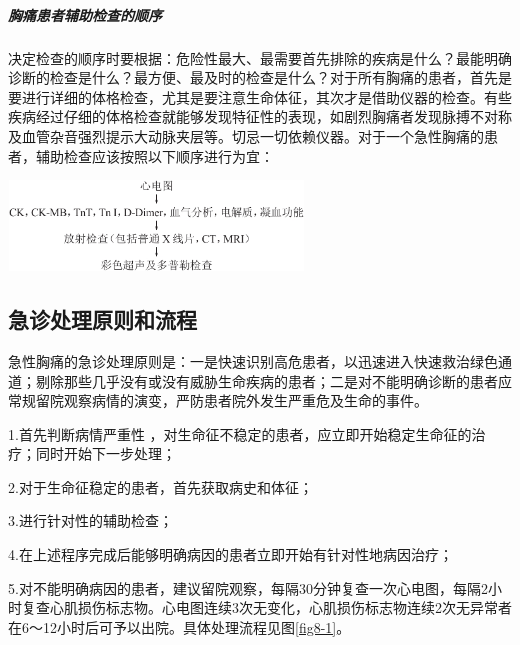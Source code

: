 \subparagraph{胸痛患者辅助检查的顺序}

决定检查的顺序时要根据：危险性最大、最需要首先排除的疾病是什么？最能明确诊断的检查是什么？最方便、最及时的检查是什么？对于所有胸痛的患者，首先是要进行详细的体格检查，尤其是要注意生命体征，其次才是借助仪器的检查。有些疾病经过仔细的体格检查就能够发现特征性的表现，如剧烈胸痛者发现脉搏不对称及血管杂音强烈提示大动脉夹层等。切忌一切依赖仪器。对于一个急性胸痛的患者，辅助检查应该按照以下顺序进行为宜：

\includegraphics[width=3.09375in,height=0.94792in]{./images/Image00043.jpg}

\subsection{急诊处理原则和流程}

急性胸痛的急诊处理原则是：一是快速识别高危患者，以迅速进入快速救治绿色通道；剔除那些几乎没有或没有威胁生命疾病的患者；二是对不能明确诊断的患者应常规留院观察病情的演变，严防患者院外发生严重危及生命的事件。

1.首先判断病情严重性
，对生命征不稳定的患者，应立即开始稳定生命征的治疗；同时开始下一步处理；

2.对于生命征稳定的患者，首先获取病史和体征；

3.进行针对性的辅助检查；

4.在上述程序完成后能够明确病因的患者立即开始有针对性地病因治疗；

5.对不能明确病因的患者，建议留院观察，每隔30分钟复查一次心电图，每隔2小时复查心肌损伤标志物。心电图连续3次无变化，心肌损伤标志物连续2次无异常者在6～12小时后可予以出院。具体处理流程见图\ref{fig8-1}。

